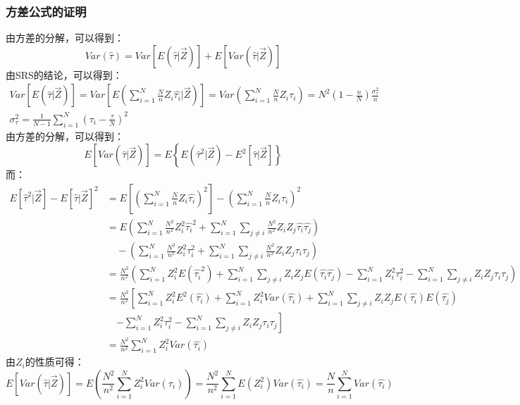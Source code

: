 \subsubsection{方差公式的证明}
由方差的分解，可以得到：
\begin{equation*}
	Var(\hat{\tau})=Var[E(\hat{\tau}|\overrightarrow{Z})]+E[Var(\hat{\tau}|\overrightarrow{Z})] 
\end{equation*}
由SRS的结论，可以得到：
\begin{gather*}
	Var[E(\hat{\tau}|\overrightarrow{Z})]=Var\left[E\left(\sum_{i=1}^{N}\frac{N}{n}Z_i\hat{\tau_i}|\overrightarrow{Z}\right)\right]=Var\left(\sum_{i=1}^{N}\frac{N}{n}Z_i\tau_i\right)=N^2\left(1-\frac{n}{N}\right)\frac{\sigma_\tau^2}{n}\\
	\sigma_\tau^2=\frac{1}{N-1}\sum_{i=1}^{N}\left(\tau_i-\frac{\tau}{N}\right)^2
\end{gather*}
由方差的分解，可以得到：
\begin{equation*}
	E[Var(\hat{\tau}|\overrightarrow{Z})]
	=E\left\{E(\hat{\tau}^2|\overrightarrow{Z})-
	 E^2[\hat{\tau}|\overrightarrow{Z}]\right\}
\end{equation*}
而：
\begin{align*}
	E[\hat{\tau}^2|\overrightarrow{Z}]-E[\hat{\tau}|\overrightarrow{Z}]^2
	&=E\left[\left(\sum_{i=1}^{N}\frac{N}{n}Z_i\hat{\tau_i}\right)^2\right]-\left(\sum_{i=1}^{N}\frac{N}{n}Z_i\tau_i\right)^2 \\
	&=E\left(\sum_{i=1}^{N}\frac{N^2}{n^2}Z_i^2\hat{\tau_i}^2+\sum_{i=1}^{N}\sum_{j\ne i}\frac{N^2}{n^2}Z_iZ_j\hat{\tau_i}\hat{\tau_j}\right) \\
	&\quad-\left(\sum_{i=1}^{N}\frac{N^2}{n^2}Z_i^2\tau_i^2+\sum_{i=1}^{N}\sum_{j\ne i}\frac{N^2}{n^2}Z_iZ_j\tau_i\tau_j\right) \\
	&=\frac{N^2}{n^2}\left(\sum_{i=1}^{N}Z_i^2E(\hat{\tau_i}^2)+\sum_{i=1}^{N}\sum_{j\ne i}Z_iZ_jE(\hat{\tau_i}\hat{\tau_j})-\sum_{i=1}^{N}Z_i^2\tau_i^2-\sum_{i=1}^{N}\sum_{j\ne i}Z_iZ_j\tau_i\tau_j\right) \\
	&=\frac{N^2}{n^2}\left[\sum_{i=1}^{N}Z_i^2E^2(\hat{\tau_i})+\sum_{i=1}^{N}Z_i^2Var(\hat{\tau_i})+\sum_{i=1}^{N}\sum_{j\ne i}Z_iZ_jE(\hat{\tau_i})E(\hat{\tau_j})\right.\\
	&\quad\left.-\sum_{i=1}^{N}Z_i^2\tau_i^2-\sum_{i=1}^{N}\sum_{j\ne i}Z_iZ_j\tau_i\tau_j\right] \\
	&=\frac{N^2}{n^2}\sum_{i=1}^{N}Z_i^2Var(\hat{\tau_i})
\end{align*}
由$Z_i$的性质可得：
\begin{equation*}
	E[Var(\hat{\tau}|\overrightarrow{Z})]=E\left(\frac{N^2}{n^2}\sum_{i=1}^{N}Z_i^2Var(\hat{\tau_i})\right)=\frac{N^2}{n^2}\sum_{i=1}^{N}E(Z_i^2)Var(\hat{\tau_i})=\frac{N}{n}\sum_{i=1}^{N}Var(\hat{\tau_i})
\end{equation*}

